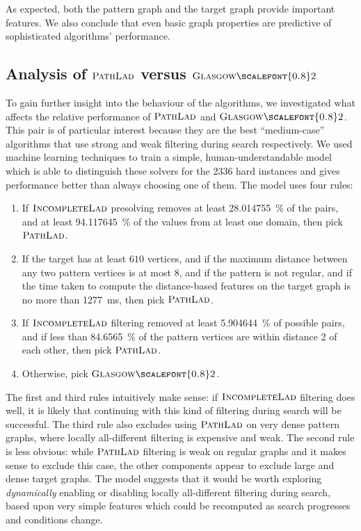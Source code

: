 \documentclass{llncs}
\newcommand{\IncompleteLAD}{$\textsc{IncompleteLad}$\xspace}
\newcommand{\PathLAD}{$\textsc{PathLad}$\xspace}
\newcommand{\GlasgowTwo}{$\textsc{Glasgow{\scalefont{0.8}2}}$\xspace}
\begin{document}
As expected, both the pattern graph and the target graph provide important
features. We also conclude that even basic graph properties are predictive of
sophisticated algorithms' performance.

\subsection{Analysis of \PathLAD versus \GlasgowTwo}

To gain further insight into the behaviour of the algorithms, we
investigated what affects the relative performance of \PathLAD and \GlasgowTwo.
This pair is of particular interest because they are the best ``medium-case''
algorithms that use strong and weak filtering during search respectively. We
used machine learning techniques to train a simple, human-understandable model
which is able to distinguish these solvers for the 2336 hard instances and gives
performance better than always choosing one of them. The model uses four rules:

\begin{enumerate}
    \item If \IncompleteLAD presolving removes at least
        \SI{28.014755}{\percent} of the pairs, and at least
        \SI{94.117645}{\percent} of the values from at least one domain, then
        pick \PathLAD.
    \item If the target has at least $610$ vertices, and if the maximum
        distance between any two pattern vertices is at most $8$, and if the
        pattern is not regular, and if the time taken to compute the
        distance-based features on the target graph is no more than
        \SI{1277}{\ms}, then pick \PathLAD.
    \item If \IncompleteLAD filtering removed at least \SI{5.904644}{\percent} of
        possible pairs, and if less than \SI{84.6565}{\percent} of the pattern
        vertices are within distance 2 of each other, then pick \PathLAD.
    \item Otherwise, pick \GlasgowTwo.
\end{enumerate}

\noindent
The first and third rules intuitively make sense: if \IncompleteLAD
filtering does well, it is likely that continuing with this kind of filtering
during search will be successful. The third rule also excludes using \PathLAD
on very dense pattern graphs, where locally all-different filtering is
expensive and weak. The second rule is less obvious: while \PathLAD filtering is
weak on regular graphs and it makes sense to exclude this case, the other
components appear to exclude large and dense target graphs. The model suggests
that it would be worth exploring \emph{dynamically} enabling or disabling
locally all-different filtering during search, based upon very simple features
which could be recomputed as search progresses and conditions change.
\end{document}
